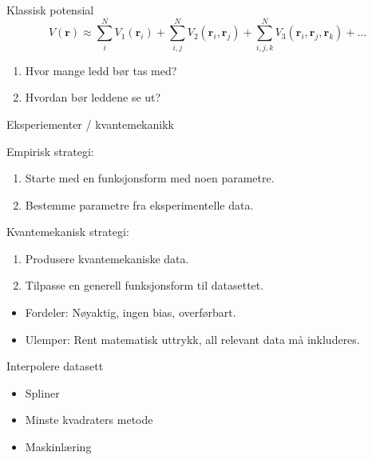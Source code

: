 \documentclass{beamer}
\begin{document}
\begin{frame}

\begin{block}{Klassisk potensial}
  \begin{equation*}
  V(\mathbf{r}) \approx \sum_i^N V_1(\mathbf{r}_i) + \sum_{i,j}^N V_2(\mathbf{r}_i, \mathbf{r}_j) + 
  \sum_{i,j,k}^N V_3(\mathbf{r}_i, \mathbf{r}_j, \mathbf{r}_k) + \dots
  \end{equation*}
\end{block}

\begin{enumerate}
 \item Hvor mange ledd bør tas med?
 \item Hvordan bør leddene se ut?
\end{enumerate}

Eksperiementer / kvantemekanikk

\end{frame}


\begin{frame}

\begin{block}{Empirisk strategi:}
 \begin{enumerate}
  \item Starte med en funksjonsform med noen parametre.
  \item Bestemme parametre fra eksperimentelle data.
 \end{enumerate}
\end{block}

\begin{block}{Kvantemekanisk strategi:}
 \begin{enumerate}
  \item Produsere kvantemekaniske data. 
  \item Tilpasse en generell funksjonsform til datasettet.
 \end{enumerate}
 
 \begin{itemize}
  \item Fordeler: Nøyaktig, ingen bias, overførbart.
  \item Ulemper: Rent matematisk uttrykk, all relevant data må inkluderes. 
 \end{itemize}
\end{block}

\end{frame}


\begin{frame}
 
\begin{block}{Interpolere datasett}
 \begin{itemize}
  \item Spliner
  \item Minste kvadraters metode
  \item Maskinlæring
 \end{itemize}
\end{block}
 
\end{frame}
\end{document}
